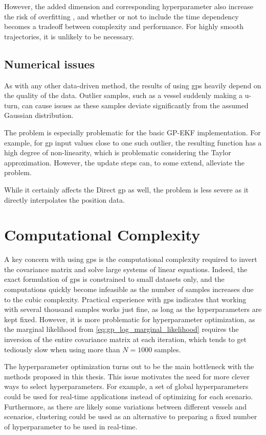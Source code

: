 However, the added dimension and corresponding hyperparameter also increase the risk of overfitting \cite{rasmussen}, and whether or not to include the time dependency becomes a tradeoff between complexity and performance. For highly smooth trajectories, it is unlikely to be necessary. 

\subsection{Numerical issues}
As with any other data-driven method, the results of using \acrshort{gp}s heavily depend on the quality of the data. Outlier samples, such as a vessel suddenly making a u-turn, can cause issues as these samples deviate significantly from the assumed Gaussian distribution.

The problem is especially problematic for the basic GP-EKF implementation. For example, for \acrshort{gp} input values close to one such outlier, the resulting function has a high degree of non-linearity, which is problematic considering the Taylor approximation. However, the update steps can, to some extend, alleviate the problem. 

While it certainly affects the Direct \acrshort{gp} as well, the problem is less severe as it directly interpolates the position data.  

\section{Computational Complexity}
A key concern with using \acrshort{gp}s is the computational complexity required to invert the covariance matrix and solve large systems of linear equations. Indeed, the exact formulation of \acrshort{gp}s is constrained to small datasets only, and the computations quickly become infeasible as the number of samples increases due to the cubic complexity. Practical experience with \acrshort{gp}s indicates that working with several thousand samples works just fine, as long as the hyperparameters are kept fixed. However, it is more problematic for hyperparameter optimization, as the marginal likelihood from \cref{eq:gp_log_marginal_likelihood} requires the inversion of the entire covariance matrix at each iteration, which tends to get tediously slow when using more than $N=1000$ samples. 

The hyperparameter optimization turns out to be the main bottleneck with the methods proposed in this thesis. This issue motivates the need for more clever ways to select hyperparameters. For example, a set of global hyperparameters could be used for real-time applications instead of optimizing for each scenario. Furthermore, as there are likely some variations between different vessels and scenarios, clustering could be used as an alternative to preparing a fixed number of hyperparameter to be used in real-time.

